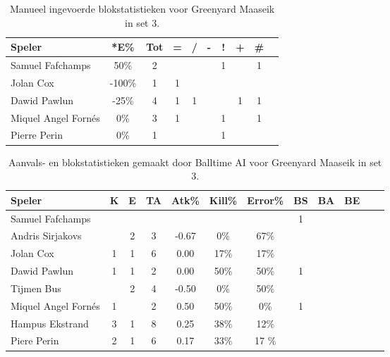 \begin{table}[ht!]
    \centering
    \scriptsize
    \begin{tabular}{|l|c|c|c|c|c|c|c|c|c|} \hline
        \textbf{Speler} & *E\% & Tot & = & / & - & ! & + & \#\\ \hline
        Samuel Fafchamps & 50\% & 2 &  &  &  & 1 &  & 1 \\ 
        Jolan Cox & -100\% & 1 & 1 &  &  &  &  &  \\
        Dawid Pawlun & -25\% & 4 & 1 & 1 &  &  & 1 & 1 \\
        Miquel Angel Fornés & 0\% & 3 & 1 &  &  & 1 &  & 1 \\ 
        Pierre Perin & 0\% & 1 &  &  &  & 1 &  &  \\ \hline
    \end{tabular}
    \caption[Manueel ingevoerde blokstatistieken voor Greenyard Maaseik in set 3]{\label{tab:PL1BlockMaaseikMan3}Manueel ingevoerde blokstatistieken voor Greenyard Maaseik in set 3.}
\end{table}

\begin{table}[ht!]
  \centering
  \scriptsize
  \begin{tabular}{|l|c|c|c|c|c|c|c|c|c|c|c|} \hline
    \textbf{Speler} &  K & E & TA & Atk\% & Kill\% & Error\% & BS & BA & BE \\ \hline
    Samuel Fafchamps &   &   &   &   &   &   & 1 &  & \\
    Andris Sirjakovs &  & 2 & 3 & -0.67 & 0\% & 67\% &   &  & \\
    Jolan Cox & 1 & 1 & 6 & 0.00 & 17\% & 17\% &  &  & \\
    Dawid Pawlun & 1 & 1 & 2 & 0.00 & 50\% & 50\% & 1 &  & \\
    Tijmen Bus &  & 2 & 4 & -0.50 & 0\% & 50\% & &  &  \\
    Miquel Angel Fornés & 1 &  & 2 & 0.50 & 50\% & 0\% & 1 & & \\
    Hampus Ekstrand & 3 & 1 & 8 & 0.25 & 38\% & 12\% &   &   &  \\
    Piere Perin & 2 & 1 & 6 & 0.17 & 33\% & 17 \%&  &  & \\ \hline
  \end{tabular}
  \caption[Aanvals- en blokstatistieken gemaakt door Balltime AI voor Greenyard Maaseik in set 3]{\label{tab:PL1AttBlockMaaseikAI3}Aanvals- en blokstatistieken gemaakt door Balltime AI voor Greenyard Maaseik in set 3.}
\end{table}
